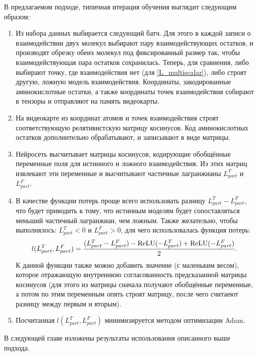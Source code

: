 В предлагаемом подходе, типичная итерация обучения выглядит следующим образом: 
\begin{enumerate}
\item Из набора данных выбирается следующий батч. Для этого в каждой записи о взаимодействии двух молекул выбирают пару взаимодействующих остатков, и производят обрезку обеих молекул под фиксированный размер так, чтобы взаимодействующая пара остатков сохранилась. Теперь, для сравнения, либо выбирают точку, где взаимодействия нет (для \ref{L_multiscalar}), либо строят другую, ложную модель взаимодействия. Координаты, закодированные аминокислотные остатки, а также координаты точек взаимодействия собирают в тензоры и отправляют на память видеокарты.
\item На видеокарте из координат атомов и точек взаимодействия строят соответствующую релятивистскую матрицу косинусов. Код аминокислотных остатков дополнительно обрабатывают, и записывают в виде матрицы.
\item Нейросеть высчитывает матрицы косинусов, кодирующие обобщённые переменные поля для истинного и ложного взаимодействия. Из этих матриц извлекают эти переменные и высчитывают частичные лагранжианы $L^{T}_{part}$ и $L^{F}_{part}$. 
\item В качестве функции потерь проще всего использовать разницу $L^{T}_{part} - L^{F}_{part}$, что будет приводить к тому, что истинным моделям будет сопоставляться меньший частичный лагранжиан, чем ложным. Также желательно, чтобы выполнялось: $L^T_{part} < 0$ и $L^{F}_{part} > 0$, для чего использовалась функция потерь:
\begin{equation}
	l(L^{T}_{part}, L^{F}_{part}) = \frac{(L^{T}_{part} - L^{F}_{part}) - \operatorname{ReLU}(-L^{T}_{part}) + \operatorname{ReLU}(-L^{F}_{part})}{2}.
\end{equation}
К данной функции также можно добавить значение (с маленьким весом), которое отражающую внутреннюю согласованность предсказанной матрицы косинусов (для этого из матрицы сначала получают обобщённые переменные, а потом по этим переменным опять строят матрицу, после чего считаеют разницу между первым и вторым).
\item Посчитанная $l(L^{T}_{part}, L^{F}_{part})$ минимизируется методом оптимизации Adam.
\end{enumerate}

В следующей главе изложены результаты использования описанного выше подхода.
